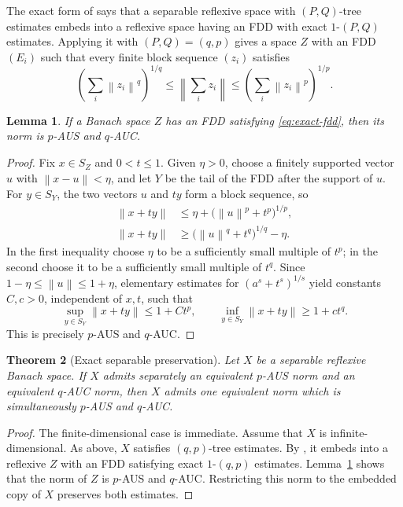\documentclass[11pt]{article}
\newtheorem{theorem}{Theorem}[section]
\newtheorem{lemma}[theorem]{Lemma}
\theoremstyle{definition}
\theoremstyle{remark}
\newcommand{\norm}[1]{\left\lVert #1\right\rVert}
\begin{document}
The exact form of \cite[Theorem~4.1(e)]{OS} says that a separable reflexive
space with \((P,Q)\)-tree estimates embeds into a reflexive space having an
FDD with exact \(1\)-\((P,Q)\) estimates.  Applying it with
\((P,Q)=(q,p)\) gives a space \(Z\) with an FDD \((E_i)\) such that every
finite block sequence \((z_i)\) satisfies
\begin{equation}\label{eq:exact-fdd}
 \left(\sum_i\norm{z_i}^q\right)^{1/q}
 \le \norm{\sum_i z_i}
 \le \left(\sum_i\norm{z_i}^p\right)^{1/p}.
\end{equation}

\begin{lemma}\label{lem:fdd-moduli}
If a Banach space \(Z\) has an FDD satisfying \eqref{eq:exact-fdd}, then its
norm is \(p\)-AUS and \(q\)-AUC.
\end{lemma}

\begin{proof}
Fix \(x\in S_Z\) and \(0<t\le1\).  Given \(\eta>0\), choose a finitely
supported vector \(u\) with \(\norm{x-u}<\eta\), and let \(Y\) be the tail
of the FDD after the support of \(u\).  For \(y\in S_Y\), the two vectors
\(u\) and \(ty\) form a block sequence, so
\begin{align*}
 \norm{x+ty}
 &\le \eta+\bigl(\norm{u}^p+t^p\bigr)^{1/p},\\
 \norm{x+ty}
 &\ge \bigl(\norm{u}^q+t^q\bigr)^{1/q}-\eta.
\end{align*}
In the first inequality choose \(\eta\) to be a sufficiently small multiple
of \(t^p\); in the second choose it to be a sufficiently small multiple of
\(t^q\).  Since \(1-\eta\le\norm{u}\le1+\eta\), elementary estimates for
\((a^s+t^s)^{1/s}\) yield constants \(C,c>0\), independent of \(x,t\),
such that
\[
 \sup_{y\in S_Y}\norm{x+ty}\le1+Ct^p,
 \qquad
 \inf_{y\in S_Y}\norm{x+ty}\ge1+ct^q.
\]
This is precisely \(p\)-AUS and \(q\)-AUC.
\end{proof}

\begin{theorem}[Exact separable preservation]\label{thm:separable}
Let \(X\) be a separable reflexive Banach space.  If \(X\) admits separately
an equivalent \(p\)-AUS norm and an equivalent \(q\)-AUC norm, then \(X\)
admits one equivalent norm which is simultaneously \(p\)-AUS and
\(q\)-AUC.
\end{theorem}

\begin{proof}
The finite-dimensional case is immediate.  Assume that \(X\) is
infinite-dimensional.  As above, \(X\) satisfies \((q,p)\)-tree estimates.  By
\cite[Theorem~4.1(e)]{OS}, it embeds into a reflexive \(Z\) with an FDD
satisfying exact \(1\)-\((q,p)\) estimates.  Lemma~\ref{lem:fdd-moduli}
shows that the norm of \(Z\) is \(p\)-AUS and \(q\)-AUC.  Restricting this
norm to the embedded copy of \(X\) preserves both estimates.
\end{proof}
\end{document}
